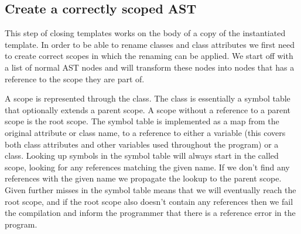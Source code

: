 %
%

\subsection{Create a correctly scoped AST}\label{subsec:inst-scoping}

This step of closing templates works on the body of a copy of the instantiated template.
In order to be able to rename classes and class attributes we first need to create correct scopes in which the renaming can be applied.
We start off with a list of normal AST nodes and will transform these nodes into nodes that has a reference to the scope they are part of.

A scope is represented through the  class.
The  class is essentially a symbol table that optionally extends a parent scope.
A scope without a reference to a parent scope is the root scope.
The symbol table is implemented as a map from the original attribute or class name, to a reference to either a variable (this covers both class attributes and other variables used throughout the program) or a class.
Looking up symbols in the symbol table will always start in the called scope, looking for any references matching the given name.
If we don't find any references with the given name we propagate the lookup to the parent scope.
Given further misses in the symbol table means that we will eventually reach the root scope, and if the root scope also doesn't contain any references then we fail the compilation and inform the programmer that there is a reference error in the program.

